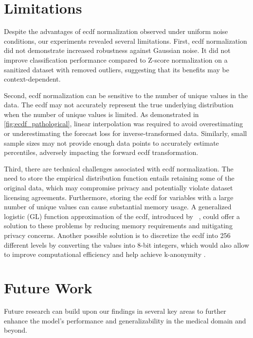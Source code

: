 \section{Limitations}

Despite the advantages of \gls{ecdf} normalization observed under uniform noise conditions, our experiments revealed several limitations. First, \gls{ecdf} normalization did not demonstrate increased robustness against Gaussian noise. It did not improve classification performance compared to Z-score normalization on a sanitized dataset with removed outliers, suggesting that its benefits may be context-dependent.

Second, \gls{ecdf} normalization can be sensitive to the number of unique values in the data. The \gls{ecdf} may not accurately represent the true underlying distribution when the number of unique values is limited. As demonstrated in \cref{fig:ecdf_pathological}, linear interpolation was required to avoid overestimating or underestimating the forecast loss for inverse-transformed data. Similarly, small sample sizes may not provide enough data points to accurately estimate percentiles, adversely impacting the forward \gls{ecdf} transformation.

Third, there are technical challenges associated with \gls{ecdf} normalization. The need to store the empirical distribution function entails retaining some of the original data, which may compromise privacy and potentially violate dataset licensing agreements. Furthermore, storing the \gls{ecdf} for variables with a large number of unique values can cause substantial memory usage. A generalized logistic (GL) function approximation of the \gls{ecdf}, introduced by \citeauthor{RobustDataScaling2016}~\cite{RobustDataScaling2016}, could offer a solution to these problems by reducing memory requirements and mitigating privacy concerns. Another possible solution is to discretize the \gls{ecdf} into 256 different levels by converting the values into 8-bit integers, which would also allow to improve computational efficiency and help achieve k-anonymity \cite{AchievingKanonymityPrivacy}.

\section{Future Work}

Future research can build upon our findings in several key areas to further enhance the model's performance and generalizability in the medical domain and beyond.

